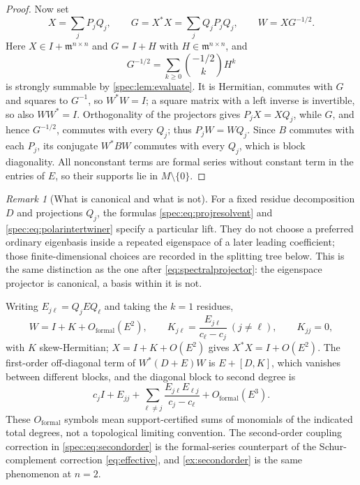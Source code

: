 \documentclass[11pt,a4paper]{article}
\numberwithin{equation}{section}
\theoremstyle{definition}
\theoremstyle{remark}
\newtheorem{remark}[remark]{Remark}
\newcommand{\mm}{\mathfrak m}
\begin{document}
\begin{proof}
Now set
\begin{equation}\label{spec:eq:polarintertwiner}
 X=\sum_jP_jQ_j,\qquad G=X^*X=\sum_jQ_jP_jQ_j,\qquad W=XG^{-1/2}.
\end{equation}
Here $X\in I+\mm^{n\times n}$ and $G=I+H$ with $H\in\mm^{n\times n}$, and
\begin{equation}\label{spec:eq:Groot}
 G^{-1/2}=\sum_{k\ge0}\binom{-1/2}{k}H^k
\end{equation}
is strongly summable by \cref{spec:lem:evaluate}. It is Hermitian, commutes
with $G$ and squares to $G^{-1}$, so $W^*W=I$; a square matrix with a left
inverse is invertible, so also $WW^*=I$. Orthogonality of the projectors
gives $P_jX=XQ_j$, while $G$, and hence $G^{-1/2}$, commutes with every
$Q_j$; thus $P_jW=WQ_j$. Since $B$ commutes with each $P_j$, its conjugate
$W^*BW$ commutes with every $Q_j$, which is block diagonality. All
nonconstant terms are formal series without constant term in the entries of
$E$, so their supports lie in $M\setminus\{0\}$.
\end{proof}

\begin{remark}[What is canonical and what is not]\label{spec:rem:canonical}
For a fixed residue decomposition $D$ and projections $Q_j$, the formulas
\eqref{spec:eq:projresolvent} and \eqref{spec:eq:polarintertwiner} specify a
particular lift. They do not choose a preferred ordinary eigenbasis inside a
repeated eigenspace of a later leading coefficient; those finite-dimensional
choices are recorded in the splitting tree below. This is the same
distinction as the one after \eqref{eq:spectralprojector}: the eigenspace
projector is canonical, a basis within it is not.
\end{remark}

Writing $E_{j\ell}=Q_jEQ_\ell$ and taking the $k=1$ residues,
\begin{equation}\label{spec:eq:firstorder}
 W=I+K+O_{\mathrm{formal}}(E^2),\qquad
 K_{j\ell}=\frac{E_{j\ell}}{c_\ell-c_j}\ (j\ne\ell),\qquad K_{jj}=0,
\end{equation}
with $K$ skew-Hermitian; $X=I+K+O(E^2)$ gives $X^*X=I+O(E^2)$. The
first-order off-diagonal term of $W^*(D+E)W$ is $E+[D,K]$, which vanishes
between different blocks, and the diagonal block to second degree is
\begin{equation}\label{spec:eq:secondorder}
 c_jI+E_{jj}+\sum_{\ell\ne j}\frac{E_{j\ell}E_{\ell j}}{c_j-c_\ell}
   +O_{\mathrm{formal}}(E^3).
\end{equation}
These $O_{\mathrm{formal}}$ symbols mean support-certified sums of monomials
of the indicated total degrees, not a topological limiting convention. The
second-order coupling correction in \eqref{spec:eq:secondorder} is the
formal-series counterpart of the Schur-complement correction
\eqref{eq:effective}, and \cref{ex:secondorder} is the same phenomenon at
$n=2$.
\end{document}
